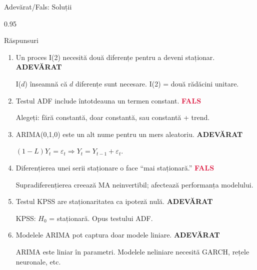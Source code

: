 \documentclass[9pt, aspectratio=169, t]{beamer}
\begin{document}
\begin{frame}{Adevărat/Fals: Soluții}
    \begin{cminipage}{0.95\textwidth}
    \begin{exampleblock}{Răspunsuri}
    \begin{enumerate}\setlength{\itemsep}{0pt}
        \item Un proces I(2) necesită două diferențe pentru a deveni staționar. \hfill \textcolor{Forest}{\textbf{ADEVĂRAT}}

        {\small \textcolor{MediumGray}{I($d$) înseamnă că $d$ diferențe sunt necesare. I(2) = două rădăcini unitare.}}

        \vspace{0.15cm}
        \item Testul ADF include întotdeauna un termen constant. \hfill \textcolor{Crimson}{\textbf{FALS}}

        {\small \textcolor{MediumGray}{Alegeți: fără constantă, doar constantă, sau constantă + trend.}}

        \vspace{0.15cm}
        \item ARIMA(0,1,0) este un alt nume pentru un mers aleatoriu. \hfill \textcolor{Forest}{\textbf{ADEVĂRAT}}

        {\small \textcolor{MediumGray}{$(1-L)Y_t = \varepsilon_t \Rightarrow Y_t = Y_{t-1} + \varepsilon_t$.}}

        \vspace{0.15cm}
        \item Diferențierea unei serii staționare o face ``mai staționară.'' \hfill \textcolor{Crimson}{\textbf{FALS}}

        {\small \textcolor{MediumGray}{Supradiferențierea creează MA neinvertibil; afectează performanța modelului.}}

        \vspace{0.15cm}
        \item Testul KPSS are staționaritatea ca ipoteză nulă. \hfill \textcolor{Forest}{\textbf{ADEVĂRAT}}

        {\small \textcolor{MediumGray}{KPSS: $H_0$ = staționară. Opus testului ADF.}}

        \vspace{0.15cm}
        \item Modelele ARIMA pot captura doar modele liniare. \hfill \textcolor{Forest}{\textbf{ADEVĂRAT}}

        {\small \textcolor{MediumGray}{ARIMA este liniar în parametri. Modelele neliniare necesită GARCH, rețele neuronale, etc.}}
    \end{enumerate}
    \end{exampleblock}
    \end{cminipage}
\end{frame}
\end{document}
